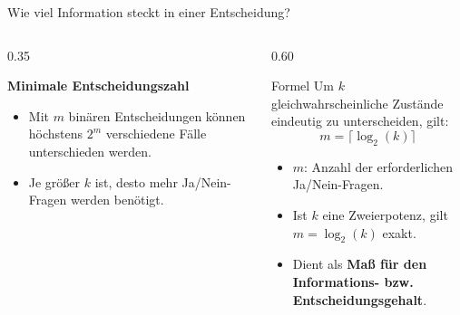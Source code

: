\begin{frame}{Wie viel Information steckt in einer Entscheidung?}

\begin{columns}

\begin{column}{0.35\textwidth}

\textbf{Minimale Entscheidungszahl}
\begin{itemize}
  \item Mit \(m\) binären Entscheidungen können höchstens \(2^m\) verschiedene Fälle unterschieden werden.
  \item Je größer \(k\) ist, desto mehr Ja/Nein-Fragen werden benötigt.
\end{itemize}

\end{column}

\begin{column}{0.60\textwidth}

\begin{block}{Formel}
Um \(k\)\; gleichwahrscheinliche Zustände eindeutig zu unterscheiden, gilt:
\vspace{-1.3ex}
\[
m = \lceil \log_2(k) \rceil
\]
\vspace{-1.3ex}
\end{block}

\begin{itemize}
  \item \(m\): Anzahl der erforderlichen Ja/Nein-Fragen.
  \item Ist \(k\) eine Zweierpotenz, gilt \(m = \log_2(k)\) exakt.
  \item Dient als \textbf{Maß für den Informations- bzw. Entscheidungsgehalt}.
\end{itemize}

\end{column}

\end{columns}

\end{frame}


